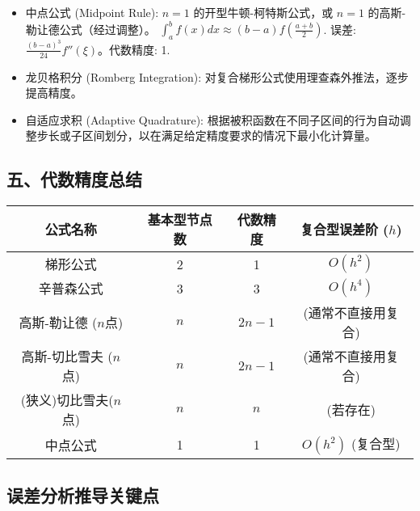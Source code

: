 \begin{itemize}
	\item 中点公式 (Midpoint Rule): $n=1$ 的开型牛顿-柯特斯公式，或 $n=1$ 的高斯-勒让德公式（经过调整）。
$\int_a^b f(x) dx \approx (b-a) f(\frac{a+b}{2})$. 误差: $\frac{(b-a)^3}{24}f''(\xi)$。代数精度: 1.
	\item 龙贝格积分 (Romberg Integration): 对复合梯形公式使用理查森外推法，逐步提高精度。
	\item 自适应求积 (Adaptive Quadrature): 根据被积函数在不同子区间的行为自动调整步长或子区间划分，以在满足给定精度要求的情况下最小化计算量。
\end{itemize}

\subsection{五、代数精度总结}

\begin{table}[h]
	\centering
	\begin{tabular}{|c|c|c|c|}
		\hline
		公式名称 & 基本型节点数 & 代数精度 & 复合型误差阶 ($h$) \\
		\hline
		梯形公式 & 2 & 1 & $O(h^2)$ \\
		\hline
		辛普森公式 & 3 & 3 & $O(h^4)$ \\
		\hline
		高斯-勒让德 ($n$点) & $n$ & $2n-1$ & (通常不直接用复合) \\
		\hline
		高斯-切比雪夫 ($n$点) & $n$ & $2n-1$ & (通常不直接用复合) \\
		\hline
		(狭义)切比雪夫($n$点) & $n$ & $n$ & (若存在) \\
		\hline
		中点公式 & 1 & 1 & $O(h^2)$ (复合型) \\
		\hline
	\end{tabular}
\end{table}
\subsection{误差分析推导关键点}

